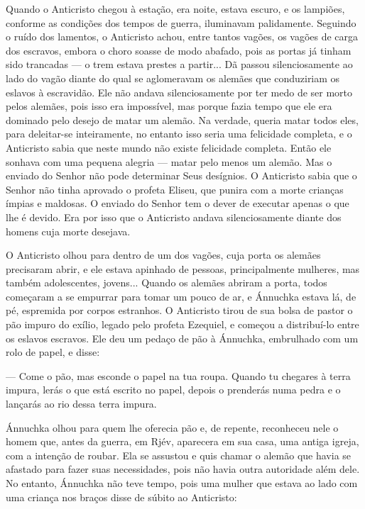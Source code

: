 Quando o Anticristo chegou à estação, era noite, estava escuro, e os
lampiões, conforme as condições dos tempos de guerra, iluminavam
palidamente. Seguindo o ruído dos lamentos, o Anticristo achou, entre
tantos vagões, os vagões de carga dos escravos, embora o choro soasse de
modo abafado, pois as portas já tinham sido trancadas --- o trem estava
prestes a partir... Dã passou silenciosamente ao lado do vagão diante do
qual se aglomeravam os alemães que conduziriam os eslavos à escravidão.
Ele não andava silenciosamente por ter medo de ser morto pelos alemães,
pois isso era impossível, mas porque fazia tempo que ele era dominado
pelo desejo de matar um alemão. Na verdade, queria matar todos eles,
para deleitar-se inteiramente, no entanto isso seria uma felicidade
completa, e o Anticristo sabia que neste mundo não existe felicidade
completa. Então ele sonhava com uma pequena alegria --- matar pelo menos
um alemão. Mas o enviado do Senhor não pode determinar Seus desígnios. O
Anticristo sabia que o Senhor não tinha aprovado o profeta Eliseu, que
punira com a morte crianças ímpias e maldosas. O enviado do Senhor tem o
dever de executar apenas o que lhe é devido. Era por isso que o
Anticristo andava silenciosamente diante dos homens cuja morte desejava.

O Anticristo olhou para dentro de um dos vagões, cuja porta os alemães
precisaram abrir, e ele estava apinhado de pessoas, principalmente
mulheres, mas também adolescentes, jovens... Quando os alemães abriram a
porta, todos começaram a se empurrar para tomar um pouco de ar, e
Ánnuchka estava lá, de pé, espremida por corpos estranhos. O Anticristo
tirou de sua bolsa de pastor o pão impuro do exílio, legado pelo profeta
Ezequiel, e começou a distribuí-lo entre os eslavos escravos. Ele deu um
pedaço de pão à Ánnuchka, embrulhado com um rolo de papel, e disse:

--- Come o pão, mas esconde o papel na tua roupa. Quando tu chegares à
terra impura, lerás o que está escrito no papel, depois o prenderás numa
pedra e o lançarás ao rio dessa terra impura.

Ánnuchka olhou para quem lhe oferecia pão e, de repente, reconheceu nele
o homem que, antes da guerra, em Rjév, aparecera em sua casa, uma antiga
igreja, com a intenção de roubar. Ela se assustou e quis chamar o alemão
que havia se afastado para fazer suas necessidades, pois não havia outra
autoridade além dele. No entanto, Ánnuchka não teve tempo, pois uma
mulher que estava ao lado com uma criança nos braços disse de súbito ao
Anticristo:

